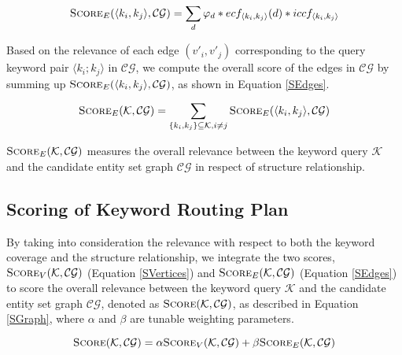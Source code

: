 \begin{eqnarray}\label{SEdge}
\textsc{Score}_{E}(\langle k_i,k_j \rangle,\mathcal{CG}) =
\sum_{d}\varphi_d * ecf_{\langle k_i,k_j \rangle}(d) * iccf_{\langle k_i,k_j \rangle}
\end{eqnarray}

Based on the relevance of each edge $(v'_i,v'_j)$ corresponding to the query keyword pair $\langle
k_i;k_j \rangle$ in $\mathcal{CG}$, we compute the overall score of the edges in $\mathcal{CG}$ by
summing up $\textsc{Score}_{E}(\langle k_i,k_j \rangle,\mathcal{CG})$, as shown in Equation
\ref{SEdges}.

\begin{equation}\label{SEdges}
\textsc{Score}_{E}(\mathcal{K},\mathcal{CG}) =
\sum_{\{k_i,k_j\} \subseteq \mathcal{K},i\neq j} \textsc{Score}_{E}(\langle k_i,k_j
\rangle,\mathcal{CG})
\end{equation}

$\textsc{Score}_{E}(\mathcal{K},\mathcal{CG})$ measures the overall relevance between the keyword
query $\mathcal{K}$ and the candidate entity set graph $\mathcal{CG}$ in respect of structure
relationship.

\subsection{Scoring of Keyword Routing Plan}


By taking into consideration the relevance with respect to both the keyword coverage and the
structure relationship, we integrate the two scores, $\textsc{Score}_{V}(\mathcal{K},\mathcal{CG})$
(Equation \ref{SVertices}) and $\textsc{Score}_{E}(\mathcal{K},\mathcal{CG})$ (Equation \ref{SEdges})
to score the overall relevance between the keyword query $\mathcal{K}$ and the candidate entity set
graph $\mathcal{CG}$, denoted as $\textsc{Score}(\mathcal{K},\mathcal{CG})$, as described in
Equation \ref{SGraph}, where $\alpha$ and $\beta$ are tunable weighting parameters.

\begin{equation}\label{SGraph}
\textsc{Score}(\mathcal{K},\mathcal{CG}) = \alpha\textsc{Score}_{V}(\mathcal{K},\mathcal{CG}) +
\beta\textsc{Score}_{E}(\mathcal{K},\mathcal{CG})
\end{equation}

